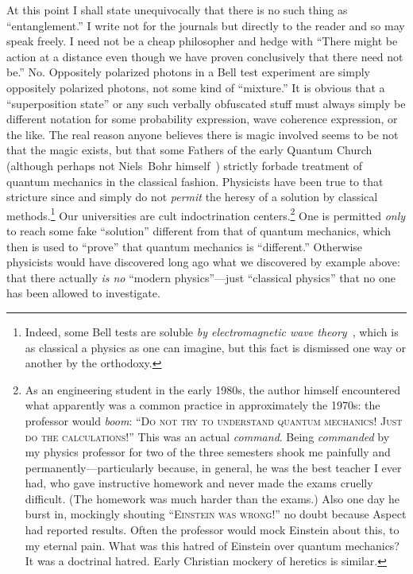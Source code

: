\documentclass[9pt,technote]{IEEEtran}
\begin{document}
At this point I shall state unequivocally that there is no such thing
as ``entanglement.'' I write not for the journals but directly to the
reader and so may speak freely. I need not be a cheap philosopher and
hedge with ``There might be action at a distance even though we have
proven conclusively that there need not be.'' No. Oppositely polarized
photons in a Bell test experiment are simply oppositely polarized
photons, not some kind of ``mixture.'' It is obvious that a
``superposition state'' or any such verbally obfuscated stuff must
always simply be different notation for some probability expression,
wave coherence expression, or the like. The real reason anyone
believes there is magic involved seems to be not that the magic
exists, but that some Fathers of the early Quantum Church (although
perhaps not Niels~Bohr himself~\cite{enwiki:1174555777}) strictly
forbade treatment of quantum mechanics in the classical
fashion. Physicists have been true to that stricture since and simply
do not {\em{permit}} the heresy of a solution by classical
methods.\footnote{Indeed, some Bell tests are soluble {\em{by
      electromagnetic wave theory}}~\cite{kracklauer:nonloc-or-geom},
  which is as classical a physics as one can imagine, but this fact is
  dismissed one way or another by the orthodoxy.} Our universities are
cult indoctrination centers.\footnote{As an engineering student in the
  early 1980s, the author himself encountered what apparently was a
  common practice in approximately the 1970s: the professor would
  {\em{boom}}: ``{\scshape{Do not try to understand quantum mechanics!
      Just do the calculations!}}'' This was an actual
  {\em{command}}. Being {\em{commanded}} by my physics professor for
  two of the three semesters shook me painfully and
  permanently---particularly because, in general, he was the best
  teacher I ever had, who gave instructive homework and never made the
  exams cruelly difficult. (The homework was much harder than the
  exams.) Also one day he burst in, mockingly shouting
  ``{\scshape{Einstein was wrong!}}'' no doubt because Aspect had
  reported results. Often the professor would mock Einstein about
  this, to my eternal pain. What was this hatred of Einstein over
  quantum mechanics? It was a doctrinal hatred. Early Christian
  mockery of heretics is similar.} One is permitted {\em{only}} to
reach some fake ``solution'' different from that of quantum mechanics,
which then is used to ``prove'' that quantum mechanics is
``different.''  Otherwise physicists would have discovered long ago
what we discovered by example above: that there actually {\em{is no}}
``modern physics''---just ``classical physics'' that no one has been
allowed to investigate.
\end{document}
